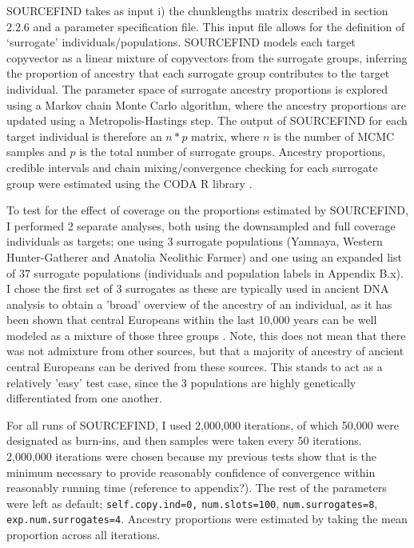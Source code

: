 SOURCEFIND takes as input i) the chunklengths matrix described in section 2.2.6 and a parameter specification file. This input file allows for the definition of `surrogate' individuals/populations. SOURCEFIND models each target copyvector as a linear mixture of copyvectors from the surrogate groups, inferring the proportion of ancestry that each surrogate group contributes to the target individual. The parameter space of surrogate ancestry proportions is explored using a Markov chain Monte Carlo algorithm, where the ancestry proportions are updated using a Metropolis-Hastings step. The output of SOURCEFIND for each target individual is therefore an $n*p$ matrix, where $n$ is the number of MCMC samples and $p$ is the total number of surrogate groups. Ancestry proportions, credible intervals and chain mixing/convergence checking for each surrogate group were estimated using the CODA R library \cite{oro22547}.

To test for the effect of coverage on the proportions estimated by SOURCEFIND, I performed 2 separate analyses, both using the downsampled and full coverage individuals as targets; one using 3 surrogate populations (Yamnaya, Western Hunter-Gatherer and Anatolia Neolithic Farmer) and one using an expanded list of 37 surrogate populations (individuals and population labels in Appendix B.x). I chose the first set of 3 surrogates as these are typically used in ancient DNA analysis to obtain a 'broad' overview of the ancestry of an individual, as it has been shown that central Europeans within the last 10,000 years can be well modeled as a mixture of those three groups \cite{Lazaridis2014, Haak2015}. Note, this does not mean that there was not admixture from other sources, but that a majority of ancestry of ancient central Europeans can be derived from these sources. This stands to act as a relatively 'easy' test case, since the 3 populations are highly genetically differentiated from one another.

For all runs of SOURCEFIND, I used 2,000,000 iterations, of which 50,000 were designated as burn-ins, and then samples were taken every 50 iterations. 2,000,000 iterations were chosen because my previous tests show that is the minimum necessary to provide reasonably confidence of convergence within reasonably running time (reference to appendix?). The rest of the parameters were left as default; \texttt{self.copy.ind=0,} \texttt{num.slots=100}, \texttt{num.surrogates=8}, \texttt{exp.num.surrogates=4}. Ancestry proportions were estimated by taking the mean proportion across all iterations. 

